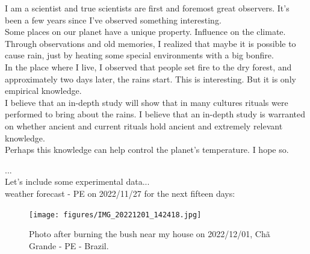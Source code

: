 \documentclass{book}
\begin{document}
I am a scientist and true scientists are first and foremost great observers. It's been a few years since I've observed something interesting. \\

Some places on our planet have a unique property. Influence on the climate. Through observations and old memories, I realized that maybe it is possible to cause rain, just by heating some special environments with a big bonfire. \\

In the place where I live, I observed that people set fire to the dry forest, and approximately two days later, the rains start. This is interesting. But it is only empirical knowledge. \\

I believe that an in-depth study will show that in many cultures rituals were performed to bring about the rains. I believe that an in-depth study is warranted on whether ancient and current rituals hold ancient and extremely relevant knowledge.\\

Perhaps this knowledge can help control the planet's temperature. I hope so.

... \\

Let's include some experimental data... \\


weather forecast - PE on 2022/11/27 for the next fifteen days:



\begin{figure}[h]
	\begin{center}
	    \caption{Photo after burning the bush near my house on 2022/12/01, Chã Grande - PE - Brazil.}
		\label{fig:bushBurning}
		\centering
		\texttt{[image: figures/IMG\_20221201\_142418.jpg]}
	\end{center}
\end{figure}
\end{document}

